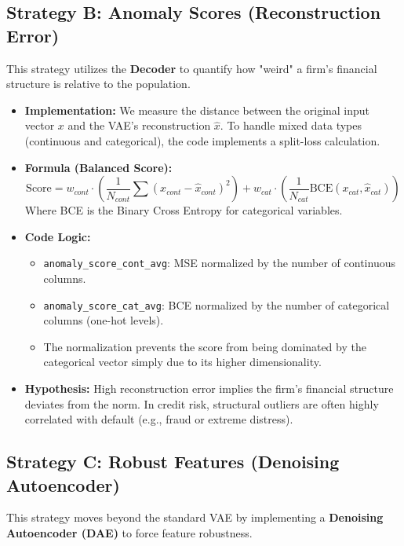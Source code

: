 \documentclass{report}\usepackage[]{graphicx}\usepackage[]{xcolor}
\begin{document}
\subsection{Strategy B: Anomaly Scores (Reconstruction Error)}
This strategy utilizes the \textbf{Decoder} to quantify how "weird" a firm's financial structure is relative to the population.

\begin{itemize}
    \item \textbf{Implementation:} We measure the distance between the original input vector $x$ and the VAE's reconstruction $\hat{x}$. To handle mixed data types (continuous and categorical), the code implements a split-loss calculation.
    \item \textbf{Formula (Balanced Score):}
    \begin{equation}
        \text{Score} = w_{cont} \cdot \left( \frac{1}{N_{cont}} \sum (x_{cont} - \hat{x}_{cont})^2 \right) + w_{cat} \cdot \left( \frac{1}{N_{cat}} \text{BCE}(x_{cat}, \hat{x}_{cat}) \right)
    \end{equation}
    Where BCE is the Binary Cross Entropy for categorical variables.
    \item \textbf{Code Logic:}
    \begin{itemize}
        \item \texttt{anomaly\_score\_cont\_avg}: MSE normalized by the number of continuous columns.
        \item \texttt{anomaly\_score\_cat\_avg}: BCE normalized by the number of categorical columns (one-hot levels).
        \item The normalization prevents the score from being dominated by the categorical vector simply due to its higher dimensionality.
    \end{itemize}
    \item \textbf{Hypothesis:} High reconstruction error implies the firm's financial structure deviates from the norm. In credit risk, structural outliers are often highly correlated with default (e.g., fraud or extreme distress).
\end{itemize}

\subsection{Strategy C: Robust Features (Denoising Autoencoder)}

This strategy moves beyond the standard VAE by implementing a \textbf{Denoising Autoencoder (DAE)} to force feature robustness.
\end{document}
